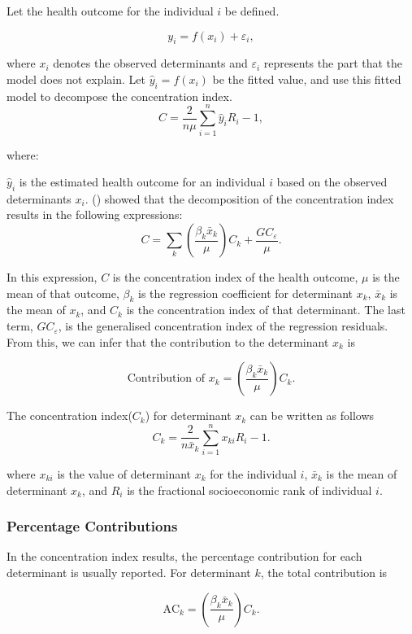 \documentclass[
  11pt,
  a4paper,
]{article}
\begin{document}
Let the health outcome for the individual \(i\) be defined.

\[
y_i = f(x_i) + \varepsilon_i,
\]

where \(x_i\) denotes the observed determinants and \(\varepsilon_i\)
represents the part that the model does not explain. Let
\(\hat{y}_i = f(x_i)\) be the fitted value, and use this fitted model to
decompose the concentration index. \[
C = \frac{2}{n\mu}\sum_{i=1}^{n} \hat{y}_i R_i - 1,
\]

where:

\(\hat{y}_i\) is the estimated health outcome for an individual \(i\)
based on the observed determinants \(x_i\).
() showed that the decomposition of the concentration
index results in the following expressions: \[
C = \sum_k \left( \frac{\beta_k \bar{x}_k}{\mu} \right) C_k + \frac{GC_\varepsilon}{\mu}.
\]

In this expression, \(C\) is the concentration index of the health
outcome, \(\mu\) is the mean of that outcome, \(\beta_k\) is the
regression coefficient for determinant \(x_k\), \(\bar{x}_k\) is the
mean of \(x_k\), and \(C_k\) is the concentration index of that
determinant. The last term, \(GC_\varepsilon\), is the generalised
concentration index of the regression residuals. From this, we can infer
that the contribution to the determinant \(x_k\) is

\[
\text{Contribution of } x_k = \left( \frac{\beta_k \bar{x}_k}{\mu} \right) C_k.
\]

The concentration index(\(C_k\)) for determinant \(x_k\) can be written
as follows \[
C_k = \frac{2}{n\bar{x}_k}\sum_{i=1}^{n}x_{ki}R_i - 1.
\]

where \(x_{ki}\) is the value of determinant \(x_k\) for the individual
\(i\), \(\bar{x}_k\) is the mean of determinant \(x_k\), and \(R_i\) is
the fractional socioeconomic rank of individual \(i\).

\subsubsection{Percentage
Contributions}\label{sec-percentage-contributions}

In the concentration index results, the percentage contribution for each
determinant is usually reported. For determinant \(k\), the total
contribution is

\[
\text{AC}_k = \left(\frac{\beta_k \bar{x}_k}{\mu}\right)C_k.
\]
\end{document}
